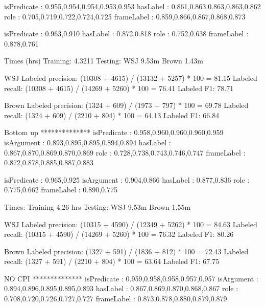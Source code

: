          isPredicate    : 0.955,0.954,0.954,0.953,0.953
            hasLabel    : 0.861,0.863,0.863,0.863,0.862
                role    : 0.705,0.719,0.722,0.724,0.725
          frameLabel    : 0.859,0.866,0.867,0.868,0.873

         isPredicate    : 0.963,0.910
            hasLabel    : 0.872,0.818
                role    : 0.752,0.638
          frameLabel    : 0.878,0.761

Times (hrs)
Training: 4.3211
Testing:
WSJ       9.53m 
Brown     1.43m 



WSJ
  Labeled precision:          (10308 + 4615) / (13132 + 5257) * 100 = 81.15 %
  Labeled recall:             (10308 + 4615) / (14269 + 5260) * 100 = 76.41 %
  Labeled F1:                 78.71

Brown
  Labeled precision:          (1324 + 609) / (1973 + 797) * 100 = 69.78 %
  Labeled recall:             (1324 + 609) / (2210 + 804) * 100 = 64.13 %
  Labeled F1:                 66.84



Bottom up
**************
         isPredicate    : 0.958,0.960,0.960,0.960,0.959
          isArgument    : 0.893,0.895,0.895,0.894,0.894
            hasLabel    : 0.867,0.870,0.869,0.870,0.869
                role    : 0.728,0.738,0.743,0.746,0.747
          frameLabel    : 0.872,0.878,0.885,0.887,0.883

         isPredicate    : 0.965,0.925
          isArgument    : 0.904,0.866
            hasLabel    : 0.877,0.836
                role    : 0.775,0.662
          frameLabel    : 0.890,0.775

Times:
Training 4.26 hrs
Testing:
WSJ          9.53m 
Brown        1.55m 

WSJ
  Labeled precision:          (10315 + 4590) / (12349 + 5262) * 100 = 84.63 %
  Labeled recall:             (10315 + 4590) / (14269 + 5260) * 100 = 76.32 %
  Labeled F1:                 80.26

Brown
  Labeled precision:          (1327 + 591) / (1836 + 812) * 100 = 72.43 %
  Labeled recall:             (1327 + 591) / (2210 + 804) * 100 = 63.64 %
  Labeled F1:                 67.75


NO CPI 
**************
         isPredicate    : 0.959,0.958,0.958,0.957,0.957
          isArgument    : 0.894,0.896,0.895,0.895,0.893
            hasLabel    : 0.867,0.869,0.870,0.868,0.867
                role    : 0.708,0.720,0.726,0.727,0.727
          frameLabel    : 0.873,0.878,0.880,0.879,0.879

